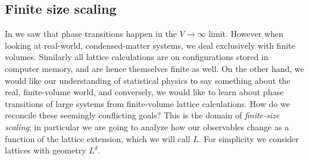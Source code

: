 \subsection{Finite size scaling}

In  we saw that phase transitions happen in the $V\to\infty$
limit. However when looking at real-world, condensed-matter systems, we deal
exclusively with finite volumes. Similarly all lattice calculations are on
configurations stored in computer memory, and are hence themselves finite as
well. On the other hand, we would like our understanding of statistical physics
to say something about the real, finite-volume world, and conversely, we would
like to learn about phase transitions of large systems from finite-volume
lattice calculations. How do we reconcile these seemingly conflicting goals?
This is the domain of {\it finite-size scaling}; in particular we are going to analyze
how our observables change as a function of the lattice extension, which we will
call $L$. For simplicity we consider lattices with geometry $L^d$.

